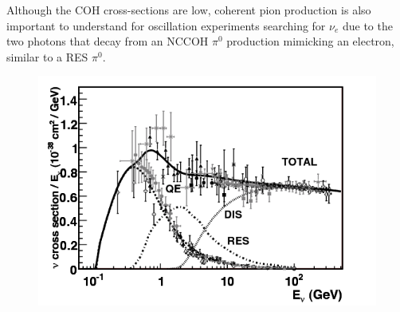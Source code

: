 Although the COH cross-sections are low, coherent pion production is also important to understand for oscillation experiments searching for $\nu_e$ due to the two photons that decay from an NCCOH $\pi^0$ production mimicking an electron, similar to a RES $\pi^0$. 
\begin{figure}[htp]
\centering
\includegraphics[scale=.55]{figs/cc_inclusive_nu.png}
\label{fig:xsec_zellar}
\end{figure}




